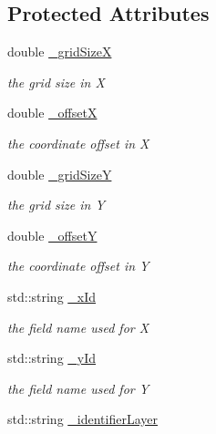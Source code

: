 \subsection*{Protected Attributes}
\begin{DoxyCompactItemize}
\item 
double \hyperlink{class_d_d4hep_1_1_d_d_segmentation_1_1_tiled_layer_grid_x_y_ab579117ca41778248009a661cbaa27b7}{\+\_\+grid\+SizeX}
\begin{DoxyCompactList}\small\item\em the grid size in X \end{DoxyCompactList}\item 
double \hyperlink{class_d_d4hep_1_1_d_d_segmentation_1_1_tiled_layer_grid_x_y_aa5658d900b004184ff4bd2160438bbeb}{\+\_\+offsetX}
\begin{DoxyCompactList}\small\item\em the coordinate offset in X \end{DoxyCompactList}\item 
double \hyperlink{class_d_d4hep_1_1_d_d_segmentation_1_1_tiled_layer_grid_x_y_ae544578762aec1e7bb735efca00a28b9}{\+\_\+grid\+SizeY}
\begin{DoxyCompactList}\small\item\em the grid size in Y \end{DoxyCompactList}\item 
double \hyperlink{class_d_d4hep_1_1_d_d_segmentation_1_1_tiled_layer_grid_x_y_ab8f5e777f372e32435efd7d915217b79}{\+\_\+offsetY}
\begin{DoxyCompactList}\small\item\em the coordinate offset in Y \end{DoxyCompactList}\item 
std\+::string \hyperlink{class_d_d4hep_1_1_d_d_segmentation_1_1_tiled_layer_grid_x_y_a55a6c20f981c68d6fbb3bbc8823ff770}{\+\_\+x\+Id}
\begin{DoxyCompactList}\small\item\em the field name used for X \end{DoxyCompactList}\item 
std\+::string \hyperlink{class_d_d4hep_1_1_d_d_segmentation_1_1_tiled_layer_grid_x_y_abcbef3de34c9e92a82bd8a6a5621aa63}{\+\_\+y\+Id}
\begin{DoxyCompactList}\small\item\em the field name used for Y \end{DoxyCompactList}\item 
std\+::string \hyperlink{class_d_d4hep_1_1_d_d_segmentation_1_1_tiled_layer_grid_x_y_a4dfef8cb6d1319b076579fd565241c84}{\+\_\+identifier\+Layer}

\end{DoxyCompactItemize}
